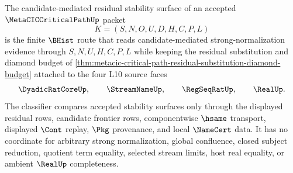 \begin{definition}
\label{def:metacic-critical-path-candidate-residual-stability-surface}
The candidate-mediated residual stability surface of an accepted $\MetaCICCriticalPathUp$ packet
$$
K=(S,N,O,U,D,H,C,P,L)
$$
is the finite $\BHist$ route that reads candidate-mediated strong-normalization evidence through $S,N,U,H,C,P,L$ while keeping the residual substitution and diamond budget of \autoref{thm:metacic-critical-path-residual-substitution-diamond-budget} attached to the four L10 source faces
$$
\DyadicRatCoreUp,\qquad
\StreamNameUp,\qquad
\RegSeqRatUp,\qquad
\RealUp .
$$
The classifier compares accepted stability surfaces only through the displayed residual rows, candidate frontier rows, componentwise $\hsame$ transport, displayed $\Cont$ replay, $\Pkg$ provenance, and local $\NameCert$ data. It has no coordinate for arbitrary strong normalization, global confluence, closed subject reduction, quotient term equality, selected stream limits, host real equality, or ambient $\RealUp$ completeness.
\end{definition}

